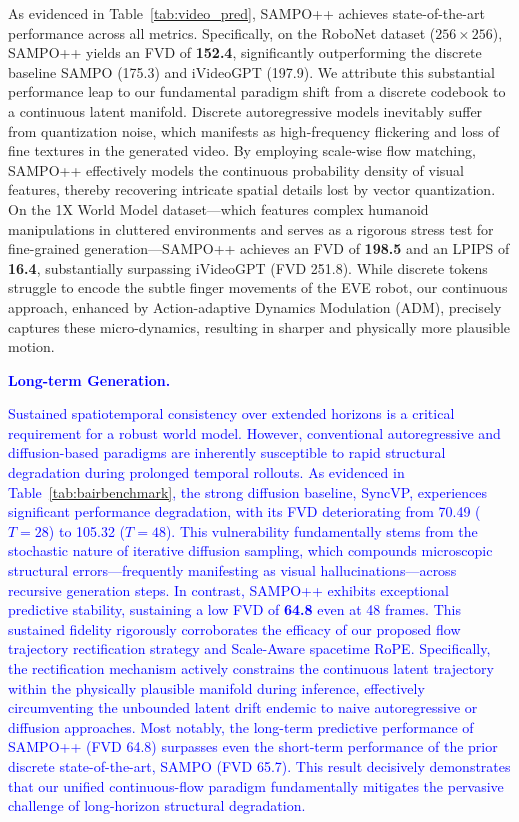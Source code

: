 As evidenced in Table~\ref{tab:video_pred}, SAMPO++ achieves state-of-the-art performance across all metrics. Specifically, on the RoboNet dataset ($256 \times 256$), SAMPO++ yields an FVD of \textbf{152.4}, significantly outperforming the discrete baseline SAMPO (175.3) and iVideoGPT (197.9). We attribute this substantial performance leap to our fundamental paradigm shift from a discrete codebook to a continuous latent manifold. Discrete autoregressive models inevitably suffer from quantization noise, which manifests as high-frequency flickering and loss of fine textures in the generated video. By employing scale-wise flow matching, SAMPO++ effectively models the continuous probability density of visual features, thereby recovering intricate spatial details lost by vector quantization.
On the 1X World Model dataset—which features complex humanoid manipulations in cluttered environments and serves as a rigorous stress test for fine-grained generation—SAMPO++ achieves an FVD of \textbf{198.5} and an LPIPS of \textbf{16.4}, substantially surpassing iVideoGPT (FVD 251.8). While discrete tokens struggle to encode the subtle finger movements of the EVE robot, our continuous approach, enhanced by Action-adaptive Dynamics Modulation (ADM), precisely captures these micro-dynamics, resulting in sharper and physically more plausible motion.


\textcolor{blue}{\textbf{Long-term Generation.}

Sustained spatiotemporal consistency over extended horizons is a critical requirement for a robust world model. However, conventional autoregressive and diffusion-based paradigms are inherently susceptible to rapid structural degradation during prolonged temporal rollouts. As evidenced in Table~\ref{tab:bairbenchmark}, the strong diffusion baseline, SyncVP, experiences significant performance degradation, with its FVD deteriorating from 70.49 ($T=28$) to 105.32 ($T=48$). This vulnerability fundamentally stems from the stochastic nature of iterative diffusion sampling, which compounds microscopic structural errors—frequently manifesting as visual hallucinations—across recursive generation steps.
In contrast, SAMPO++ exhibits exceptional predictive stability, sustaining a low FVD of \textbf{64.8} even at 48 frames. This sustained fidelity rigorously corroborates the efficacy of our proposed flow trajectory rectification strategy and Scale-Aware spacetime RoPE. Specifically, the rectification mechanism actively constrains the continuous latent trajectory within the physically plausible manifold during inference, effectively circumventing the unbounded latent drift endemic to naive autoregressive or diffusion approaches. Most notably, the long-term predictive performance of SAMPO++ (FVD 64.8) surpasses even the short-term performance of the prior discrete state-of-the-art, SAMPO (FVD 65.7). This result decisively demonstrates that our unified continuous-flow paradigm fundamentally mitigates the pervasive challenge of long-horizon structural degradation.}


